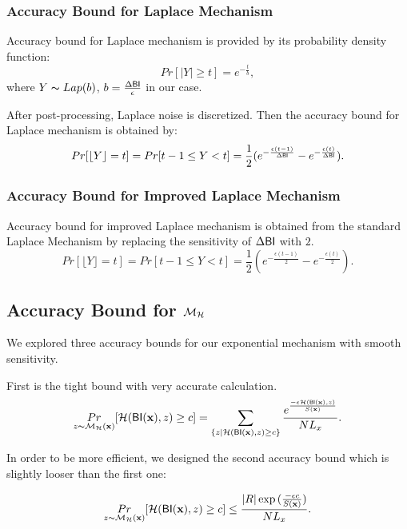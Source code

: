 \documentclass{article}
\begin{document}
\subsubsection{Accuracy Bound for Laplace Mechanism}
\label{subsec_accuracy_lap}
Accuracy bound for Laplace mechanism is provided by its probability density function:
\begin{equation*}
Pr[|Y| \geq t] = e^{- \frac{t}{b}},
\end{equation*}
where $Y \thicksim Lap(b)$, $b = \frac{\Delta \mathsf{BI}}{\epsilon}$ in our case.

After post-processing, Laplace noise is discretized. Then the accuracy bound for Laplace mechanism is obtained by:
\[
Pr[\lfloor Y \rfloor = t] = Pr[ t-1 \leq Y < t] = \frac{1}{2} (e^{- \frac{\epsilon (t - 1)}{\Delta \mathsf{BI}}} - e^{- \frac{\epsilon (t)}{\Delta \mathsf{BI}}}).
\]

\subsubsection{Accuracy Bound for Improved Laplace Mechanism}
\label{subsec_accuracy_lap}
Accuracy bound for improved Laplace mechanism is obtained from the standard Laplace Mechanism by replacing the sensitivity of $\Delta \mathsf{BI}$ with $2$.
\[
Pr[\lfloor Y \rfloor = t] = Pr[ t-1 \leq Y < t] = \frac{1}{2} (e^{- \frac{\epsilon (t - 1)}{2}} - e^{- \frac{\epsilon (t)}{2}}).
\]


\subsection{Accuracy Bound for $\mathcal{M}_{\mathcal{H}}$}
\label{subsec_accuracy_smoo}
We explored three accuracy bounds for our exponential mechanism with smooth sensitivity.

First is the tight bound with very accurate calculation.
\begin{equation*}
\underset{z \thicksim \mathcal{M}_{\mathcal{H}}(\textbf{x})}{Pr}[\mathcal{H}(\mathsf{BI}(\textbf{x}), z) \geq c] = \sum\limits_{\{z | \mathcal{H}(\mathsf{BI}(\textbf{x}), z) \geq c\}} \frac{e^{\frac{- \epsilon \mathcal{H}(\mathsf{BI}(\textbf{x}), z)}{S(\textbf{x})}}}{NL_x}.
\end{equation*}

In order to be more efficient, we designed the second accuracy bound which is slightly looser than the first one:

\begin{equation*}
\underset{z \thicksim \mathcal{M}_{\mathcal{H}}(\textbf{x})}{Pr}[\mathcal{H}(\mathsf{BI}(\textbf{x}), z) \geq c] \leq \frac{|R| \exp{(\frac{- \epsilon c}{S(\textbf{x})}})}{NL_x}.
\end{equation*}
\end{document}
